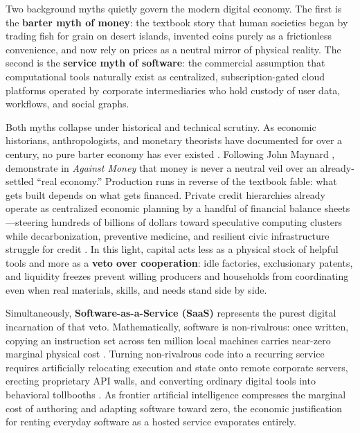 \documentclass[11pt]{article}
\begin{document}
Two background myths quietly govern the modern digital economy. The first is the \textbf{barter myth of money}: the textbook story that human societies began by trading fish for grain on desert islands, invented coins purely as a frictionless convenience, and now rely on prices as a neutral mirror of physical reality. The second is the \textbf{service myth of software}: the commercial assumption that computational tools naturally exist as centralized, subscription-gated cloud platforms operated by corporate intermediaries who hold custody of user data, workflows, and social graphs.

Both myths collapse under historical and technical scrutiny. As economic historians, anthropologists, and monetary theorists have documented for over a century, no pure barter economy has ever existed \citep{innes1913money, humphrey1985barter, graeber2011debt}. Following John Maynard \citet{keynes1933monetary, keynes1936general}, \citet{mason2026against} demonstrate in \emph{Against Money} that money is never a neutral veil over an already-settled ``real economy.'' Production runs in reverse of the textbook fable: what gets built depends on what gets financed. Private credit hierarchies already operate as centralized economic planning by a handful of financial balance sheets---steering hundreds of billions of dollars toward speculative computing clusters while decarbonization, preventive medicine, and resilient civic infrastructure struggle for credit \citep{mason2014fisher, jayadev2018mmt, mason2026against}. In this light, capital acts less as a physical stock of helpful tools and more as a \textbf{veto over cooperation}: idle factories, exclusionary patents, and liquidity freezes prevent willing producers and households from coordinating even when real materials, skills, and needs stand side by side.

Simultaneously, \textbf{Software-as-a-Service (SaaS)} represents the purest digital incarnation of that veto. Mathematically, software is non-rivalrous: once written, copying an instruction set across ten million local machines carries near-zero marginal physical cost \citep{benkler2002coase}. Turning non-rivalrous code into a recurring service requires artificially relocating execution and state onto remote corporate servers, erecting proprietary API walls, and converting ordinary digital tools into behavioral tollbooths \citep{kleppmann2019local, zuboff2019surveillance, balkin2016fiduciaries}. As frontier artificial intelligence compresses the marginal cost of authoring and adapting software toward zero, the economic justification for renting everyday software as a hosted service evaporates entirely.
\end{document}
